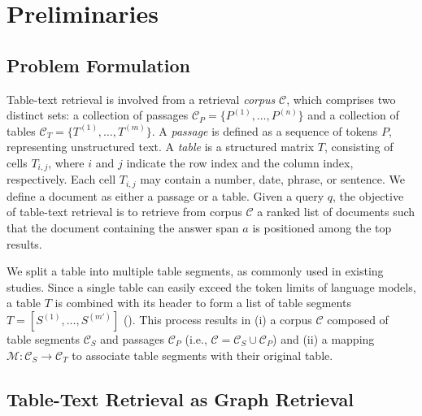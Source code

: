 \vspace{-1mm}
\section{Preliminaries}
\vspace{-1mm}


\subsection{Problem Formulation}
\label{sec:problem_formulation}
\vspace{-1mm}

Table-text retrieval is involved from a retrieval \textit{corpus} $\mathcal{C}$, which comprises two distinct sets: a collection of passages $\mathcal{C}_P = \{P^{(1)}, \dots, P^{(n)}\}$ and a collection of tables $\mathcal{C}_T = \{T^{(1)}, \dots, T^{(m)}\}$. 
A \textit{passage} is defined as a sequence of tokens $P$, representing unstructured text. 
A \textit{table} is a structured matrix $T$, consisting of cells $T_{i, j}$, where $i$ and $j$ indicate the row index and the column index, respectively. 
Each cell $T_{i, j}$ may contain a number, date, phrase, or sentence.
We define a document as either a passage or a table.
Given a query $q$, the objective of table-text retrieval is to retrieve from corpus $\mathcal{C}$ a ranked list of documents such that the document containing the answer span $a$ is positioned among the top results.

We split a table into multiple table segments, as commonly used in existing studies. 
Since a single table can easily exceed the token limits of language models, a table $T$ is combined with its header to form a list of table segments $T = [S^{(1)}, \dots, S^{(m')}]$ (\citealt{OTT-QA}). 
This process results in (i) a corpus $\mathcal{C}$ composed of table segments $\mathcal{C}_S$ and passages $\mathcal{C}_P$ (i.e., $\mathcal{C} = \mathcal{C}_S \cup \mathcal{C}_P$) and (ii) a mapping $\mathcal{M}: \mathcal{C}_S \rightarrow \mathcal{C}_T$ to associate table segments with their original table.






\vspace{-1mm}
\subsection{Table-Text Retrieval as Graph Retrieval}
\label{sec:table_text_retrieval_as_bipartite_graph_retrieval}
\vspace{-1mm}


